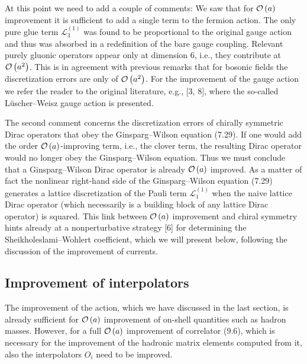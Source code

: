 At this point we need to add a couple of comments: We saw that for $\mathcal{O}\left(a\right)$
improvement it is sufficient to add a single term to the fermion action. The
only pure glue term $\mathcal{L}^{(1)}_3$ was found to be proportional to the
original gauge action and thus was absorbed in a redefinition of the bare
gauge coupling. Relevant purely gluonic operators appear only at dimension 6,
i.e., they contribute at $\mathcal{O}\left(a^2\right)$. This is in agreement with previous
remarks that for bosonic fields the discretization errors are only of
$\mathcal{O}\left(a^2\right)$. For the improvement of the gauge action we refer the reader to
the original literature, e.g., [3, 8], where the so-called L\"uscher--Weisz
gauge action is presented.

The second comment concerns the discretization errors of chirally symmetric
Dirac operators that obey the Ginsparg--Wilson equation (7.29). If one would
add the order $\mathcal{O}\left(a\right)$-improving term, i.e., the clover term, the resulting
Dirac operator would no longer obey the Ginsparg--Wilson equation. Thus we
must conclude that a Ginsparg--Wilson Dirac operator is already $\mathcal{O}\left(a\right)$
improved. As a matter of fact the nonlinear right-hand side of the
Ginsparg--Wilson equation (7.29) generates a lattice discretization of the
Pauli term $\mathcal{L}^{(1)}_1$ when the naive lattice Dirac operator (which
necessarily is a building block of any lattice Dirac operator) is squared.
This link between $\mathcal{O}\left(a\right)$ improvement and chiral symmetry hints already at
a nonperturbative strategy [6] for determining the Sheikholeslami--Wohlert
coefficient, which we will present below, following the discussion of the
improvement of currents.

\subsection{Improvement of interpolators}
\label{sec:9.1.3}

The improvement of the action, which we have discussed in the last section, is
already sufficient for $\mathcal{O}\left(a\right)$ improvement of on-shell quantities such as
hadron masses. However, for a full $\mathcal{O}\left(a\right)$ improvement of correlator
(9.6), which is necessary for the improvement of the hadronic matrix elements
computed from it, also the interpolators $O_i$ need to be improved.

